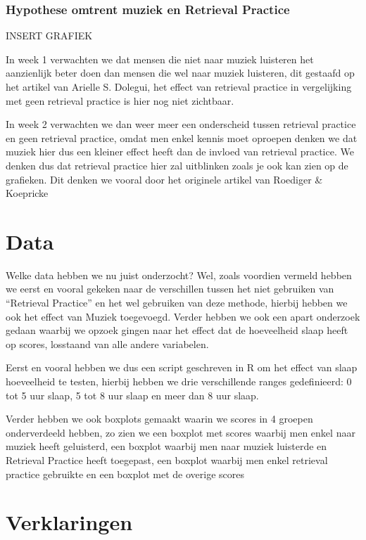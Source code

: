 \documentclass{hogent-article}
\begin{document}
\subsubsection{Hypothese omtrent muziek en Retrieval Practice}

INSERT GRAFIEK

In week 1 verwachten we dat mensen die niet naar muziek luisteren het aanzienlijk beter doen dan mensen die wel naar muziek luisteren, dit gestaafd op het artikel van Arielle S. Dolegui, het effect van retrieval practice in vergelijking met geen retrieval practice is hier nog niet zichtbaar.

In week 2 verwachten we dan weer meer een onderscheid tussen retrieval practice en geen retrieval practice, omdat men enkel kennis moet oproepen denken we dat muziek hier dus een kleiner effect heeft dan de invloed van retrieval practice. We denken dus dat retrieval practice hier zal uitblinken zoals je ook kan zien op de grafieken. Dit denken we vooral door het originele artikel van Roediger \& Koepricke
\section{Data}

Welke data hebben we nu juist onderzocht? Wel, zoals voordien vermeld hebben we eerst en vooral gekeken naar de verschillen tussen het niet gebruiken van “Retrieval Practice” en het wel gebruiken van deze methode, hierbij hebben we ook het effect van Muziek toegevoegd. Verder hebben we ook een apart onderzoek gedaan waarbij we opzoek gingen naar het effect dat de hoeveelheid slaap heeft op scores, losstaand van alle andere variabelen.

Eerst en vooral hebben we dus een script geschreven in R om het effect van slaap hoeveelheid te testen, hierbij hebben we drie verschillende ranges gedefinieerd: 0 tot 5 uur slaap, 5 tot 8 uur slaap en meer dan 8 uur slaap. 

Verder hebben we ook boxplots gemaakt waarin we scores in 4 groepen onderverdeeld hebben, zo zien we een boxplot met scores waarbij men enkel naar muziek heeft geluisterd, een boxplot waarbij men naar muziek luisterde en Retrieval Practice heeft toegepast, een boxplot waarbij men enkel retrieval practice gebruikte en een boxplot met de overige scores
\section{Verklaringen}
\end{document}
